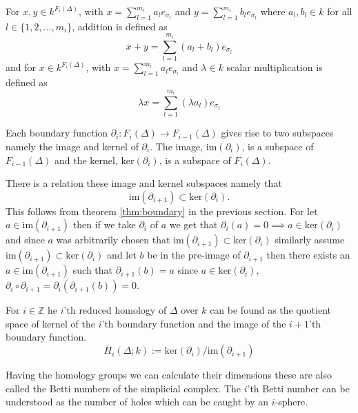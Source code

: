 \documentclass[11pt,a4paper,twoside]{report}
\begin{document}
For $x,y\in k^{F_i(\Delta)}$, with $x = \sum_{l=1}^{m_i}a_le_{\sigma_l}$ and $y = \sum_{l=1}^{m_i}b_le_{\sigma_l}$ where $a_l,b_l\in k$ for all $l\in\{1,2,\dots,m_i\}$, addition is defined as 
\begin{equation*}
x+y = \sum_{l=1}^{m_i}(a_l+b_l)e_{\sigma_l}
\end{equation*}
and for $x\in k^{F_i(\Delta)}$, with $x = \sum_{l=1}^{m_i}a_le_{\sigma_l}$ and $\lambda \in k$ scalar multiplication is defined as 
\begin{equation*}
\lambda x = \sum_{l=1}^{m_i}(\lambda a_l)e_{\sigma_l}
\end{equation*}

Each boundary function $\partial_i:F_i(\Delta)\to F_{i-1}(\Delta)$ gives rise to two subspaces namely the image and kernel of $\partial_i$. The image, $\textrm{im}(\partial_i)$, is a subspace of $F_{i-1}(\Delta)$ and the kernel, $\textrm{ker}(\partial_i)$, is a subspace of $F_{i}(\Delta)$. 

There is a relation these image and kernel subspaces namely that 
\begin{equation*}
\textrm{im}(\partial_{i+1})\subset\textrm{ker}(\partial_i).
\end{equation*}
This follows from theorem \ref{thm:boundary} in the previous section. 
For let $a\in \textrm{im}(\partial_{i+1})$ then if we take $\partial_i$ of $a$ we get that $\partial_i(a)=0\implies a\in \textrm{ker}(\partial_i)$ and since $a$ was arbitrarily chosen that $\textrm{im}(\partial_{i+1})\subset \textrm{ker}(\partial_i)$ 
similarly assume $\textrm{im}(\partial_{i+1})\subset \textrm{ker}(\partial_i)$ and let $b$ be in the pre-image of $\partial_{i+1}$ then there exists an $a\in\textrm{im}(\partial_{i+1})$ such that 
$\partial_{i+1}(b)=a$ since $a\in\textrm{ker}(\partial_i)$, $\partial_i\circ\partial_{i+1}=\partial_i(\partial_{i+1}(b))=0$. 

For $i\in\mathbb{Z}$ he $i$'th reduced homology of $\Delta$ over $k$ can be found as the quotient space of kernel of the $i$'th boundary function and the image of the $i+1$'th boundary function. \cite[p.2]{Allgaier}
\begin{equation}
\bar{H}_i(\Delta;k):=\textrm{ker}(\partial_i)/\textrm{im}(\partial_{i+1})
\end{equation}

Having the homology groups we can calculate their dimensions these are also called the Betti numbers of the simplicial complex. The $i$'th Betti number can be understood as the number of holes which can be caught by an $i$-sphere. \cite{wikiBetti}
\end{document}
